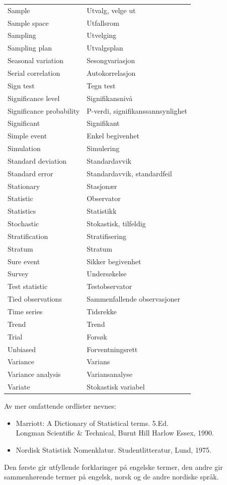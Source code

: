 \begin{center}
\begin{tabular}{ll}
Sample           & Utvalg, velge ut \\
Sample space     & Utfallsrom \\
Sampling         & Utvelging \\
Sampling plan    & Utvalgsplan \\
Seasonal variation & Sesongvariasjon \\
Serial correlation & Autokorrelasjon \\
Sign test          & Tegn test \\
Significance level & Signifikansnivå \\
Significance probability & P-verdi, signifikanssannsynlighet \\
Significant        & Signifikant \\
Simple event       & Enkel begivenhet \\
Simulation         & Simulering \\
Standard deviation & Standardavvik \\
Standard error     & Standardavvik, standardfeil \\
Stationary         & Stasjonær \\
Statistic          & Observator \\
Statistics         & Statistikk  \\
Stochastic         & Stokastisk, tilfeldig \\
Stratification     & Stratifisering \\
Stratum            & Stratum \\
Sure event         & Sikker begivenhet \\
Survey             & Undersøkelse \\
Test statistic     & Testobservator \\
Tied observations  & Sammenfallende observasjoner \\
Time series        & Tidsrekke \\
Trend              & Trend \\
Trial              & Forsøk \\
Unbiased           & Forventningsrett \\
Variance           & Varians \\
Variance analysis  & Variansanalyse \\
Variate            & Stokastisk variabel \\
\end{tabular}
\end{center}  
\normalsize
Av mer omfattende ordlister nevnes: 
\small
\begin{itemize}
\item[]
Marriott: A Dictionary of Statistical terms.  5.Ed.\\
  Longman Scientific \& Technical, Burnt Hill Harlow Essex, 1990. 
\item[]
Nordisk Statistisk Nomenklatur.  Studentlitteratur, Lund, 1975. \\
\end{itemize}
\normalsize
Den første gir utfyllende forklaringer på engelske termer, den 
andre gir sammenhørende termer på engelsk, norsk og de andre
nordiske språk.

